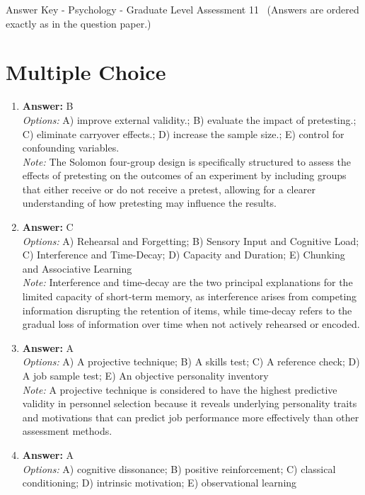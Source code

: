 \documentclass[12pt]{article}
\begin{document}
\begin{center}
Answer Key - Psychology - Graduate Level Assessment 11 \
\small (Answers are ordered exactly as in the question paper.)
\end{center}

\section*{Multiple Choice}
\begin{enumerate}[label=\arabic*.]
\item \textbf{Answer:} B
\\ \textit{Options:} A) improve external validity.; B) evaluate the impact of pretesting.; C) eliminate carryover effects.; D) increase the sample size.; E) control for confounding variables.
\\ \textit{Note:} The Solomon four-group design is specifically structured to assess the effects of pretesting on the outcomes of an experiment by including groups that either receive or do not receive a pretest, allowing for a clearer understanding of how pretesting may influence the results.
\item \textbf{Answer:} C
\\ \textit{Options:} A) Rehearsal and Forgetting; B) Sensory Input and Cognitive Load; C) Interference and Time-Decay; D) Capacity and Duration; E) Chunking and Associative Learning
\\ \textit{Note:} Interference and time-decay are the two principal explanations for the limited capacity of short-term memory, as interference arises from competing information disrupting the retention of items, while time-decay refers to the gradual loss of information over time when not actively rehearsed or encoded.
\item \textbf{Answer:} A
\\ \textit{Options:} A) A projective technique; B) A skills test; C) A reference check; D) A job sample test; E) An objective personality inventory
\\ \textit{Note:} A projective technique is considered to have the highest predictive validity in personnel selection because it reveals underlying personality traits and motivations that can predict job performance more effectively than other assessment methods.
\item \textbf{Answer:} A
\\ \textit{Options:} A) cognitive dissonance; B) positive reinforcement; C) classical conditioning; D) intrinsic motivation; E) observational learning

\end{enumerate}
\end{document}
